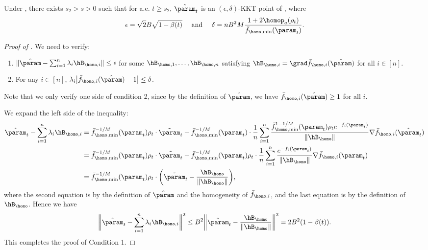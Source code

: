 \begin{lemma}
\label{lem: tilde theta KKT condition}
Under , there exists $s_2>s>0$ such that for a.e. $t\ge s_2$, $\hat \param_t $ is an $(\epsilon, \delta)$-KKT point of , where 
\[
    \epsilon = \sqrt{2}B \sqrt{1-\beta(t)} \quad  \text{ and } \quad \delta = n B^2M \frac{1+2 \homop_a(\rho_t)}{ \bar f_{\homo,\min }(\param_t)}.
\]
\end{lemma}
\begin{proof}[Proof of ]
We need to verify:
\begin{enumerate}
    \item $\|\hat \param- \sum_{i=1}^n \lambda_i \hB_{\homo,i} \| \le \epsilon $ for some $\hB_{\homo,1},\ldots ,\hB_{\homo,n}$ satisfying $\hB_{\homo,i}=\grad \bar f_{\homo,i}(\hat\param)$ for all $i\in [n]$.
    \item For any $i\in [n]$, $\lambda_i \big| \bar f_{\homo,i}(\hat \param) -1 \big| \le \delta $. 
\end{enumerate}
Note that we only verify one side of condition 2, since by the definition of $ \hat \param $, we have $\bar f_{\homo,i}(\hat \param) \ge 1$ for all $i$.

\vspace{1em}
  We expand the left side of the inequality: 
\begin{align*}
    \hat \param_t - \sum_{i=1}^n \lambda_i \hB_{\homo,i}
    &= \bar f_{\homo,\min}^{-1 / M} (\param_t ) \rho_t\cdot \tilde{\param}_t  - \bar f_{\homo,\min}^{-1 / M}(\param_t ) \cdot \frac{1}{n} \sum_{i=1}^{n}  \frac{\bar f_{\homo,\min}^{1-1 / M}(\param_t ) \rho_t e^{-\bar f_i(\param_t )}}{ \|\hB_{\homo}\|}  \nabla \bar f_{\homo,i}(\hat \param_t )  \\ 
    & =  \bar f_{\homo,\min}^{-1 / M}(\param_t ) \rho_t\cdot \tilde{\param_t} - \bar f_{\homo,\min}^{-1 / M}(\param_t )\rho_t \cdot \frac{1}{n} \sum_{i=1}^{n}  \frac{  e^{-\bar f_i(\param_t )}}{ \|\hB_{\homo}\|}  \nabla \bar f_{\homo,i}(\param_t ) \\ 
    & = \bar f_{\homo,\min}^{-1 / M}(\param_t ) \rho_t\cdot \bigg ( \tilde{\param}_t  - \frac{\hB_{\homo}}{\|\hB_{\homo}\|} \bigg),
\end{align*}
where the second equation is by the definition of $\hat \param$ and the homogeneity of $\bar f_{\homo,i}$, and the last equation is by the definition of $\hB_{\homo}$.
Hence we have 
\[
    \bigg\| \hat \param_t - \sum_{i=1}^n \lambda_i \hB_{\homo,i} \bigg\|^2 \le B^2 \bigg \|\tilde{\param}_t  - \frac{\hB_{\homo}}{\|\hB_{\homo}\|} \bigg\|^2  = 2B^2 (1-\beta(t)).
\]
This completes the proof of Condition 1. 


\end{proof}
